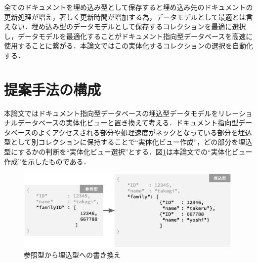 \documentclass[a4paper,11pt]{ujreport}
\begin{document}
全てのドキュメントを埋め込み型として保存すると埋め込み先のドキュメントの更新処理が増え，著しく更新時間が増加する為，データモデルとして最適とは言えない．埋め込み型のデータモデルとして保存するコレクションを最適に選択し，データモデルを最適化することがドキュメント指向型データベースを高速に使用することに繋がる．本論文ではこの実体化するコレクションの選択を自動化する．

\section{提案手法の構成}
本論文ではドキュメント指向型データベースの埋込型データモデルをリレーショナルデータベースの実体化ビューと置き換えて考える．ドキュメント指向型データベースのよくアクセスされる部分や処理速度がネックとなっている部分を埋込型として別コレクションに保持することで“実体化ビュー作成”，どの部分を埋込型にするかの判断を“実体化ビュー選択”とする．図\ref{figure:ReferenceToEmbed}は本論文での“実体化ビュー作成”を示したものである．
\begin{figure}[htbp]
	\begin{center}
		\includegraphics[width=30em, trim=0 13em 0 0]{src/ReferenceToEmbed.eps} %
	\end{center}
	\caption{参照型から埋込型への書き換え}
	\label{figure:ReferenceToEmbed}
\end{figure}
\end{document}
